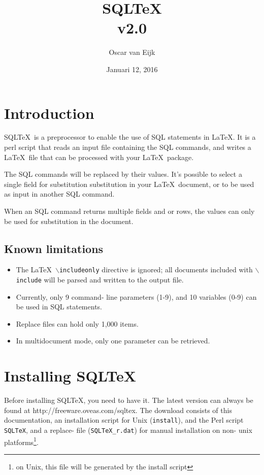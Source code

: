 \documentclass{article}
\newcommand{\bs}{\ensuremath{\backslash}}
\begin{document}
\title{SQL\TeX\\v2.0}
\date{Januari 12, 2016}
\author{Oscar van Eijk}
\maketitle
\hrulefill
\tableofcontents
\hrulefill

\section{Introduction}

SQL\TeX\ is a preprocessor to enable the use of SQL statements in \LaTeX. It is a perl script that reads
an input file containing the SQL commands, and writes a \LaTeX\ file that can be processed with your
\LaTeX\ package.

The SQL commands will be replaced by their values. It's possible to select a single field for substitution
substitution in your \LaTeX\ document, or to be used as input in another SQL command.

When an SQL command returns multiple fields and or rows, the values can only be used for substitution
in the document.

\subsection{Known limitations}

\begin{itemize}
\item The \LaTeX\ \texttt{\bs includeonly} directive is ignored; all documents included with \texttt{\bs include} will be parsed and written to the output file.
\item Currently, only 9 command- line parameters (1-9), and 10 variables (0-9) can be used in SQL statements.
\item Replace files can hold only 1,000 items.
\item In multidocument mode, only one parameter can be retrieved.
\end{itemize}

\section{Installing SQL\TeX}

Before installing SQL\TeX, you need to have it. The latest version can always be found at
\textsf{http://freeware.oveas.com/sqltex}.
The download consists of this do\-cumentation, an installation script for Unix
(\texttt{install}), and the Perl script \texttt{SQLTeX}, and a replace- file (\texttt{SQLTeX\_r.dat}) for manual installation
on non- unix platforms\footnote{on Unix, this file will be generated by the install script}.
\end{document}
